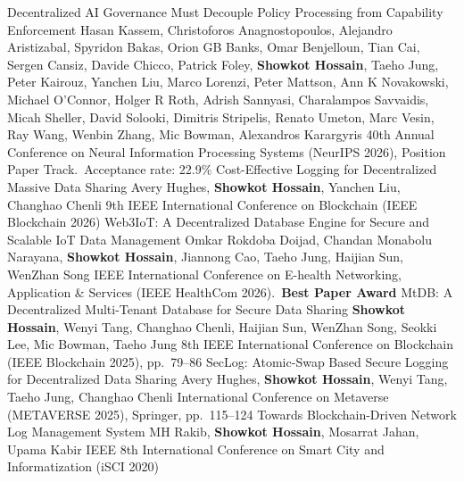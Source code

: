 \begin{cvlist}
    {Decentralized AI Governance Must Decouple Policy Processing from Capability Enforcement}
    {Hasan Kassem, Christoforos Anagnostopoulos, Alejandro Aristizabal, Spyridon Bakas, Orion GB Banks, Omar Benjelloun, Tian Cai, Sergen Cansiz, Davide Chicco, Patrick Foley, \textbf{Showkot Hossain}, Taeho Jung, Peter Kairouz, Yanchen Liu, Marco Lorenzi, Peter Mattson, Ann K Novakowski, Michael O'Connor, Holger R Roth, Adrish Sannyasi, Charalampos Savvaidis, Micah Sheller, David Solooki, Dimitris Stripelis, Renato Umeton, Marc Vesin, Ray Wang, Wenbin Zhang, Mic Bowman, Alexandros Karargyris}
    {40th Annual Conference on Neural Information Processing Systems (NeurIPS 2026), Position Paper Track.\ \upshape Acceptance rate: 22.9\%}
    {Cost-Effective Logging for Decentralized Massive Data Sharing}
    {Avery Hughes, \textbf{Showkot Hossain}, Yanchen Liu, Changhao Chenli}
    {9th IEEE International Conference on Blockchain (IEEE Blockchain 2026)}
    {Web3IoT: A Decentralized Database Engine for Secure and Scalable IoT Data Management}
    {Omkar Rokdoba Doijad, Chandan Monabolu Narayana, \textbf{Showkot Hossain}, Jiannong Cao, Taeho Jung, Haijian Sun, WenZhan Song}
    {IEEE International Conference on E-health Networking, Application \& Services (IEEE HealthCom 2026).\ \upshape\textbf{Best Paper Award}}
    {MtDB: A Decentralized Multi-Tenant Database for Secure Data Sharing}
    {\textbf{Showkot Hossain}, Wenyi Tang, Changhao Chenli, Haijian Sun, WenZhan Song, Seokki Lee, Mic Bowman, Taeho Jung}
    {8th IEEE International Conference on Blockchain (IEEE Blockchain 2025), pp.\ 79--86}
\cvpub[METAVERSE 2025]{[C2]}
    {SecLog: Atomic-Swap Based Secure Logging for Decentralized Data Sharing}
    {Avery Hughes, \textbf{Showkot Hossain}, Wenyi Tang, Taeho Jung, Changhao Chenli}
    {International Conference on Metaverse (METAVERSE 2025), Springer, pp.\ 115--124}
    {Towards Blockchain-Driven Network Log Management System}
    {MH Rakib, \textbf{Showkot Hossain}, Mosarrat Jahan, Upama Kabir}
    {IEEE 8th International Conference on Smart City and Informatization (iSCI 2020)}
\end{cvlist}

